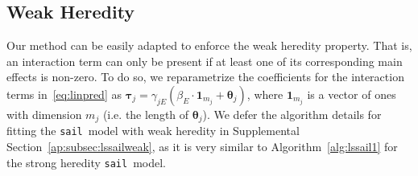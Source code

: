 \documentclass[a4paper,fleqn]{cas-sc}
\makeatletter
\newcommand{\sail}{\texttt{sail}}
\newcommand{\tm}[1]{\textrm{{#1}}}
\newcommand{\btau}{\boldsymbol{\tau}}
\newcommand{\mb}[1]{\mathbf{#1}}
\newcommand{\btheta}{\boldsymbol{\theta}}
\newcommand{\bPsi}{\boldsymbol{\Psi}}
\DeclareMathOperator*{\argmin}{arg\,min}
\DeclarePairedDelimiter\abs{\lvert}{\rvert}%
\DeclarePairedDelimiter\norm{\lVert}{\rVert}%
\let\oldabs\abs
\def\abs{\@ifstar{\oldabs}{\oldabs*}}
\let\oldnorm\norm
\def\norm{\@ifstar{\oldnorm}{\oldnorm*}}
\makeatother
\begin{document}

\subsection{Weak Heredity}
Our method can be easily adapted to enforce the weak heredity property. 
That is, an interaction term can only be present if at least one of its corresponding main effects is non-zero. To do so, we reparametrize the coefficients for the interaction terms in~\eqref{eq:linpred} as $\btau_{j} = \gamma_{jE}  (\beta_E \cdot \mb{1}_{m_j} + \btheta_j)$, where $\mb{1}_{m_j}$ is a vector of ones with dimension $m_j$ (i.e. the length of $\btheta_j$). We defer the algorithm details for fitting the \sail ~model with weak heredity in Supplemental Section~\ref{ap:subsec:lssailweak}, as it is very similar to Algorithm~\ref{alg:lssail1} for the strong heredity \sail ~model.
\end{document}
